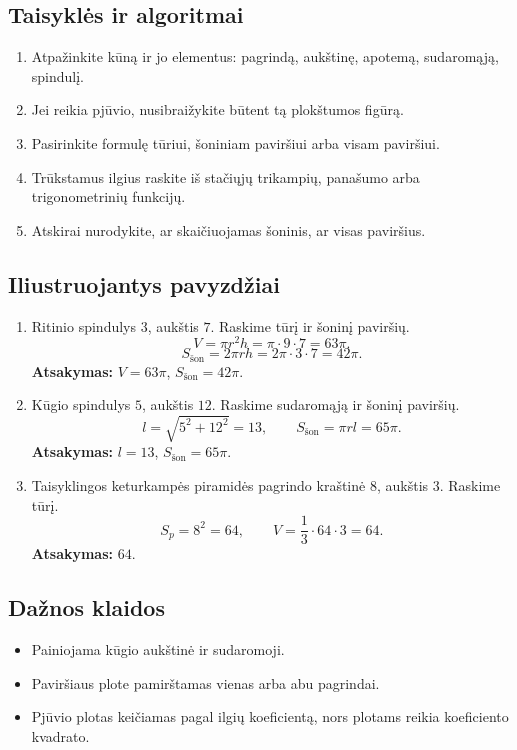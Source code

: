 \subsection{Taisyklės ir algoritmai}
\begin{enumerate}[label=\arabic*.]
\item Atpažinkite kūną ir jo elementus: pagrindą, aukštinę, apotemą, sudaromąją, spindulį.
\item Jei reikia pjūvio, nusibraižykite būtent tą plokštumos figūrą.
\item Pasirinkite formulę tūriui, šoniniam paviršiui arba visam paviršiui.
\item Trūkstamus ilgius raskite iš stačiųjų trikampių, panašumo arba trigonometrinių funkcijų.
\item Atskirai nurodykite, ar skaičiuojamas šoninis, ar visas paviršius.
\end{enumerate}

\subsection{Iliustruojantys pavyzdžiai}
\begin{enumerate}[label=\arabic*.]
\item Ritinio spindulys \(3\), aukštis \(7\). Raskime tūrį ir šoninį paviršių.
\[
V=\pi r^2h=\pi\cdot9\cdot7=63\pi.
\]
\[
S_{\text{šon}}=2\pi rh=2\pi\cdot3\cdot7=42\pi.
\]
\textbf{Atsakymas:} \(V=63\pi\), \(S_{\text{šon}}=42\pi\).

\item Kūgio spindulys \(5\), aukštis \(12\). Raskime sudaromąją ir šoninį paviršių.
\[
l=\sqrt{5^2+12^2}=13,\qquad S_{\text{šon}}=\pi rl=65\pi.
\]
\textbf{Atsakymas:} \(l=13\), \(S_{\text{šon}}=65\pi\).

\item Taisyklingos keturkampės piramidės pagrindo kraštinė \(8\), aukštis \(3\). Raskime tūrį.
\[
S_p=8^2=64,\qquad V=\frac13\cdot64\cdot3=64.
\]
\textbf{Atsakymas:} \(64\).
\end{enumerate}

\subsection{Dažnos klaidos}
\begin{itemize}
\item Painiojama kūgio aukštinė ir sudaromoji.
\item Paviršiaus plote pamirštamas vienas arba abu pagrindai.
\item Pjūvio plotas keičiamas pagal ilgių koeficientą, nors plotams reikia koeficiento kvadrato.
\end{itemize}


